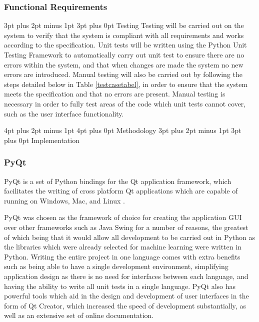 \documentclass[12pt,a4paper]{article}
\makeatletter
\renewcommand\subsection{\@startsection {subsection}{1}{2mm} %
      {3pt plus 2pt minus 1pt} %
      {3pt plus 0pt} %
      {\normalfont\bfseries}}
\renewcommand\section{\@startsection {section}{1}{0mm} %
      {4pt plus 2pt minus 1pt} %
      {4pt plus 0pt} %
      {\bfseries}}
\makeatother
\begin{document}
\subsubsection{Functional Requirements} \label{reqspec}

\subsection{Testing}
Testing will be carried out on the system to verify that the system is compliant with all requirements and works according to the specification. Unit tests will be written using the Python Unit Testing Framework to automatically carry out unit test to ensure there are no errors within the system, and that when changes are made the system no new errors are introduced. Manual testing will also be carried out by following the steps detailed below in Table \ref{testcasetabel}, in order to ensure that the system meets the specification and that no errors are present. Manual testing is necessary in order to fully test areas of the code which unit tests cannot cover, such as the user interface functionality.


\newpage
\section{Methodology}
\subsection{Implementation}
\subsubsection{PyQt}
PyQt is a set of Python bindings for the Qt application framework, which facilitates the writing of cross platform Qt applications which are capable of running on Windows, Mac, and Linux \parencite{pyqt5}.

PyQt was chosen as the framework of choice for creating the application GUI over other frameworks such as Java Swing for a number of reasons, the greatest of which being that it would allow all development to be carried out in Python as the libraries which were already selected for machine learning were written in Python. Writing the entire project in one language comes with extra benefits such as being able to have a single development environment, simplifying application design as there is no need for interfaces between each language, and having the ability to write all unit tests in a single language. PyQt also has powerful tools which aid in the design and development of user interfaces in the form of Qt Creator, which increased the speed of development substantially, as well as an extensive set of online documentation.
\end{document}
